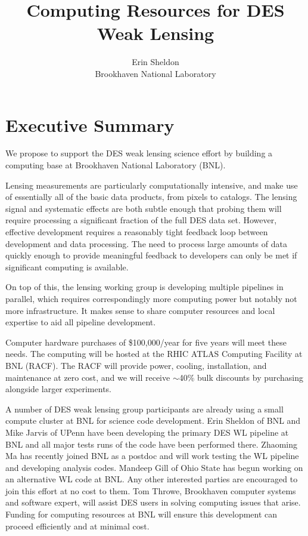 \documentclass[12pt]{article}
\begin{document}
\title{Computing Resources for DES Weak Lensing}
\author{Erin Sheldon\\{\normalsize Brookhaven National Laboratory}}

\date{}
\maketitle


\section{Executive Summary}

We propose to support the DES weak lensing science effort by building a
computing base at Brookhaven National Laboratory (BNL).  

Lensing measurements are particularly computationally intensive, and make use
of essentially all of the basic data products, from pixels to catalogs.  The
lensing signal and systematic effects are both subtle enough that probing them
will require processing a significant fraction of the full DES data set.
However, effective development requires a reasonably tight feedback loop
between development and data processing.  The need to process large amounts
of data quickly enough to provide meaningful feedback to developers 
can only be met if significant computing is available.

On top of this, the lensing working group is developing multiple pipelines in
parallel, which requires correspondingly more computing power but notably not
more infrastructure.  It makes sense to share computer resources and local
expertise to aid all pipeline development.

Computer hardware purchases of \$100,000/year for five years will meet these
needs.  The computing will be hosted at the RHIC ATLAS Computing Facility at
BNL (RACF).  The RACF will provide power, cooling, installation, and
maintenance at zero cost, and we will receive $\sim$40\% bulk discounts by
purchasing alongside larger experiments.

A number of DES weak lensing group participants are already using a small
compute cluster at BNL for science code development.  Erin Sheldon of BNL and
Mike Jarvis of UPenn have been developing the primary DES WL pipeline at BNL
and all major tests runs of the code have been performed there.  Zhaoming Ma
has recently joined BNL as a postdoc and will work testing the WL pipeline and
developing analysis codes.  Mandeep Gill of Ohio State has begun working on an
alternative WL code at BNL.  Any other interested parties are encouraged to
join this effort at no cost to them.  Tom Throwe, Brookhaven computer systems
and software expert, will assist DES users in solving computing issues that
arise.  Funding for computing resources at BNL will ensure this development can
proceed efficiently and at minimal cost.
\end{document}
